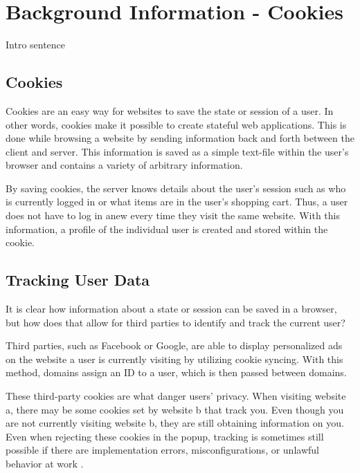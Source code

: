 \chapter{Background Information - Cookies}
\label{ch:bg_cookies}
Intro sentence


%
%
\section{Cookies}
\label{sec:bg_cookies:cookies}
Cookies are an easy way for websites to save the state or session of a user. In other words, cookies make it possible to create stateful web applications. This is done while browsing a website by sending information back and forth between the client and server. This information is saved as a simple text-file within the user's browser and contains a variety of arbitrary information. \cite{cookies1}

By saving cookies, the server knows details about the user's session such as who is currently logged in or what items are in the user's shopping cart. Thus, a user does not have to log in anew every time they visit the same website. With this information, a profile of the individual user is created and stored within the cookie. \cite{cookies1}



%
%
\section{Tracking User Data}
\label{sec:bg_cookies:data}
It is clear how information about a state or session can be saved in a browser, but how does that allow for third parties to identify and track the current user?

Third parties, such as Facebook or Google, are able to display personalized ads on the website a user is currently visiting by utilizing cookie syncing. With this method, domains assign an ID to a user, which is then passed between domains. \cite{cookies2}

These third-party cookies are what danger users' privacy. When visiting website a, there may be some cookies set by website b that track you. Even though you are not currently visiting website b, they are still obtaining information on you. Even when rejecting these cookies in the popup, tracking is sometimes still possible if there are implementation errors, misconfigurations, or unlawful behavior at work \cite{thirdPartyCookies}.

